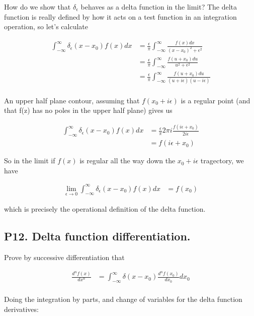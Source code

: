 \documentclass{article}
\newcommand{\IIinf}[0]{ \int_{-\infty}^\infty }
\begin{document}
How do we show that $\delta_\epsilon$ behaves as a delta function in the limit?  The delta function is really defined by how it
acts on a test function in an integration operation, so let's calculate 

\begin{align*}
\IIinf \delta_\epsilon(x - x_0) f(x) dx 
&=
\frac{\epsilon }{\pi} \IIinf \frac{f(x) dx}{(x-x_0)^2 + \epsilon^2} \\
&=
\frac{\epsilon }{\pi} \IIinf \frac{f(u + x_0) du}{u^2 + \epsilon^2} \\
&=
\frac{\epsilon }{\pi} \IIinf \frac{f(u + x_0) du}{(u + i \epsilon)(u - i \epsilon)} \\
\end{align*}

An upper half plane contour, assuming that $f(x_0 + i\epsilon)$ is a regular point (and that f(z) has no poles in the upper half plane) gives us

\begin{align*}
\IIinf \delta_\epsilon(x - x_0) f(x) dx 
&=
\frac{\epsilon }{\pi} 2 \pi i \frac{f(i \epsilon + x_0) }{2 i \epsilon} \\
&=
f(i \epsilon + x_0)
\end{align*}

So in the limit if $f(x)$ is regular all the way down the $x_0 + i\epsilon$ tragectory, we have

\begin{align*}
\lim_{\epsilon \rightarrow 0} \IIinf \delta_\epsilon(x - x_0) f(x) dx &= f(x_0)
\end{align*}

which is precisely the operational definition of the delta function.

\subsection{ P12. Delta function differentiation. }

Prove by successive differentiation that

\begin{align*}
\frac{d^n f(x)}{dx^n} 
&= \int_{-\infty}^{\infty} \delta(x - x_0) \frac{d^n f(x_0)}{dx_0} dx_0 \\
\end{align*}

Doing the integration by parts, and change of variables for the delta function derivatives:
\end{document}
